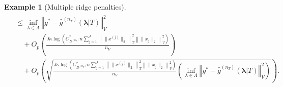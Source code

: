 \documentclass[12pt]{article} %
\theoremstyle{definition}
\newtheorem{example}{Example}
\begin{document}
\begin{example}[Multiple ridge penalties]
\begin{align}
\begin{split}
	&\le \inf_{\lambda \in \Lambda} \left\Vert g^* - \hat{g}^{(n_T)}( \boldsymbol{\lambda} | T) \right \Vert^2_{V}\\
	& \quad + O_p\left (
	\frac{J \kappa \log \left (
		C^*_{D^{(n_T)}} n
		\sum_{j = 1}^J \left \|\|x^{(j)} \|_2 \right \|_T^2 \left \|\|x_j\|_2 \right \|_V^2
		\right )}{n_{V}}
	\right ) \\
	&\quad + O_p\left(
	\sqrt{
		\frac{J \kappa \log \left (
			C^*_{D^{(n_T)}} n
			\sum_{j = 1}^J \left \|\|x^{(j)} \|_2 \right \|_T^2 \left \|\|x_j\|_2 \right \|_V^2
			\right )}
		{n_{V}}
		\left(
		\inf_{\lambda \in \Lambda} \left\Vert g^* - \hat{g}^{(n_T)}(\boldsymbol{\lambda} | T)\right\Vert_{V}^2
		\right)
	}
	\right ).
	\end{split}
	\end{align}
\end{example}
\end{document}
